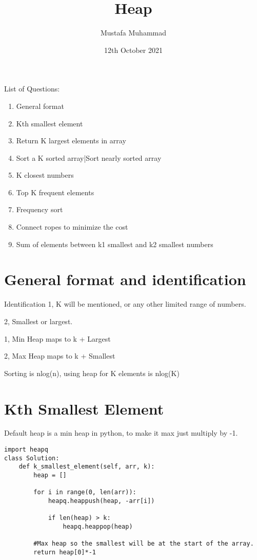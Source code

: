 \documentclass[24pt, a4]{article}
\title{Heap}
\author{Mustafa Muhammad}
\date{12th October 2021}
\begin{document}
\maketitle

\newpage

List of Questions:
\begin{enumerate}
    \item{General format}
    \item{Kth smallest element}
    \item{Return K largest elements in array}
    \item{Sort a K sorted array|Sort nearly sorted array}
    \item{K closest numbers}
    \item{Top K frequent elements}
    \item{Frequency sort}
    \item{Connect ropes to minimize the cost}
    \item{Sum of elements between k1 smallest and k2 smallest numbers}
\end{enumerate}

\section{General format and identification}
Identification
1, K will be mentioned, or any other limited range of numbers.

2, Smallest or largest.

1, Min Heap maps to k + Largest

2, Max Heap maps to k + Smallest

Sorting is nlog(n), using heap for K elements is nlog(K)

\section{Kth Smallest Element}
Default heap is a min heap in python, to make it max just multiply by -1.

\begin{lstlisting}
import heapq
class Solution:
    def k_smallest_element(self, arr, k):
        heap = []

        for i in range(0, len(arr)):
            heapq.heappush(heap, -arr[i])

            if len(heap) > k:
                heapq.heappop(heap)
                
        #Max heap so the smallest will be at the start of the array.
        return heap[0]*-1
\end{lstlisting}
\end{document}
